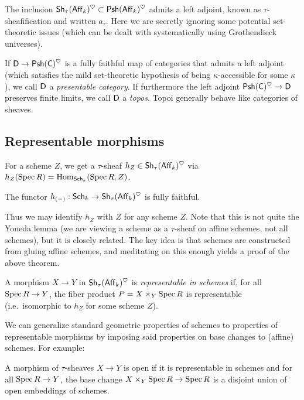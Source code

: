 \documentclass{amsart}
\begin{document}
The inclusion $\mathsf{Sh}_\tau(\mathsf{Aff}_k)^\heartsuit \subset \mathsf{Psh}(\mathsf{Aff}_k)^\heartsuit$ admits a left adjoint, known as $\tau$-sheafification and written $a_\tau$.
Here we are secretly ignoring some potential set-theoretic issues (which can be dealt with systematically using Grothendieck universes).

\begin{rmk}
	If $\mathsf{D} \to \mathsf{Psh}(\mathsf{C})^\heartsuit$ is a fully faithful map of categories that admits a left adjoint (which satisfies the mild set-theoretic hypothesis of being $\kappa$-accessible for some $\kappa$), we call $\mathsf{D}$ a \emph{presentable category}.
	If furthermore the left adjoint $\mathsf{Psh}(\mathsf{C})^\heartsuit \to \mathsf{D}$ preserves finite limits, we call $\mathsf{D}$ a \emph{topos}.
	Topoi generally behave like categories of sheaves.
\end{rmk}

\subsection{Representable morphisms}

For a scheme $Z$, we get a $\tau$-sheaf $h_Z \in \mathsf{Sh}_\tau(\mathsf{Aff}_k)^\heartsuit$ via $h_Z(\operatorname{Spec} R) = \operatorname{Hom}_{\mathsf{Sch}_k}(\operatorname{Spec} R, Z)$.

\begin{thm}
	The functor $h_{(-)}: \mathsf{Sch}_k \to \mathsf{Sh}_\tau(\mathsf{Aff}_k)^\heartsuit$ is fully faithful.
\end{thm}

Thus we may identify $h_Z$ with $Z$ for any scheme $Z$.
Note that this is not quite the Yoneda lemma (we are viewing a scheme as a $\tau$-sheaf on affine schemes, not all schemes), but it is closely related.
The key idea is that schemes are constructed from gluing affine schemes, and meditating on this enough yields a proof of the above theorem.

\begin{dfn}
	A morphism $X \to Y$ in $\mathsf{Sh}_\tau(\mathsf{Aff}_k)^\heartsuit$ is \emph{representable in schemes} if, for all $\operatorname{Spec} R \to Y$, the fiber product $P = X \times_Y \operatorname{Spec} R$ is representable (i.e.\ isomorphic to $h_Z$ for some scheme $Z$).
\end{dfn}

We can generalize standard geometric properties of schemes to properties of representable morphisms by imposing said properties on base changes to (affine) schemes.
For example:

\begin{dfn}
	A morphism of $\tau$-sheaves $X \to Y$ is open if it is representable in schemes and for all $\operatorname{Spec} R \to Y$, the base change $X \times_Y \operatorname{Spec} R \to \operatorname{Spec} R$ is a disjoint union of open embeddings of schemes.
\end{dfn}
\end{document}
